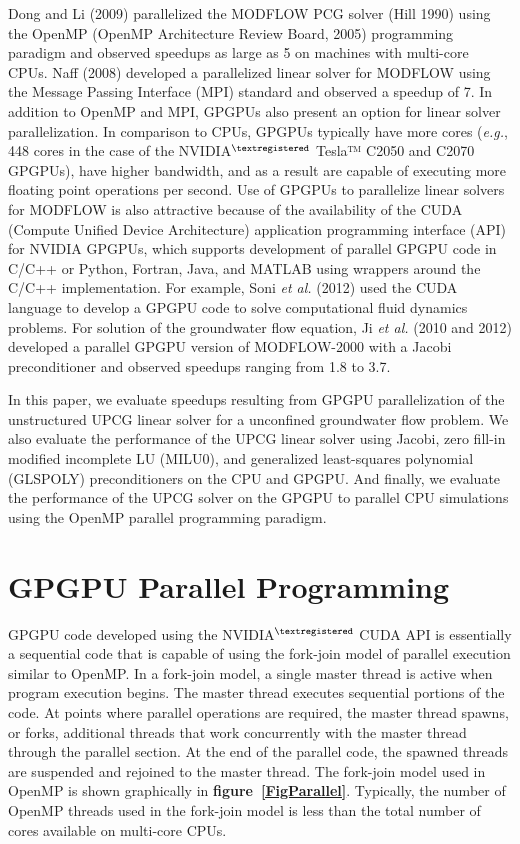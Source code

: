 \documentclass[12pt]{article}
\begin{document}
\color{black}Dong and Li (2009) parallelized the MODFLOW PCG solver (Hill 1990) using the OpenMP (OpenMP Architecture Review Board, 2005) programming paradigm and observed speedups as large as 5 on machines with multi-core CPUs. Naff (2008) developed a parallelized linear solver for MODFLOW using the Message Passing Interface (MPI) standard and observed a speedup of 7. In addition to OpenMP and MPI, GPGPUs also \color{blue}present \color{black}an option for linear solver parallelization. In comparison to CPUs, GPGPUs \color{blue}typically have more cores (\textit{e.g.}, 448 cores in the case of the NVIDIA$^{\textregistered}$ Tesla™ C2050 and C2070 GPGPUs), have higher bandwidth, and as a result are capable of executing more floating point operations per second. \color{black}Use of GPGPUs to parallelize linear solvers for MODFLOW is also attractive because of the availability of the CUDA (Compute Unified Device Architecture) application programming interface (API) for NVIDIA GPGPUs, which supports development of parallel GPGPU code in C/C++ or Python, Fortran, Java, and MATLAB using wrappers around the C/C++ implementation. For example, Soni \textit{et al.} (2012) used the CUDA language to develop a GPGPU code to solve computational fluid dynamics problems. For solution of the groundwater flow equation, Ji \textit{et al.} (\color{cyan}2010 and \color{black}2012) developed a parallel GPGPU version of MODFLOW-2000 with a Jacobi preconditioner and observed speedups ranging from 1.8 to 3.7.

In this paper, we evaluate speedups resulting from GPGPU parallelization of the unstructured UPCG linear solver for a unconfined groundwater flow problem. We also evaluate the performance of the UPCG linear solver using Jacobi, zero fill-in modified incomplete LU (MILU0), and generalized least-squares polynomial (GLSPOLY) preconditioners on the CPU and GPGPU. And finally, we evaluate the performance of the UPCG solver on the GPGPU to parallel CPU simulations using the OpenMP parallel programming paradigm.

\section* {\bf GPGPU Parallel Programming}
GPGPU code developed using the NVIDIA$^{\textregistered}$ CUDA API is essentially a sequential code that is capable of using the fork-join model of parallel execution similar to OpenMP. In a fork-join model, a single master thread is active when program execution begins. The master thread executes sequential portions of the code. At points where parallel operations are required, the master thread spawns, or forks, additional threads that work concurrently with the master thread through the parallel section. At the end of the parallel code, the spawned threads are suspended and rejoined to the master thread. The fork-join model used in OpenMP is shown graphically in \textbf{figure~\ref{FigParallel}}. Typically, the number of OpenMP threads used in the fork-join model is less than the total number of cores available on multi-core CPUs.
\end{document}
